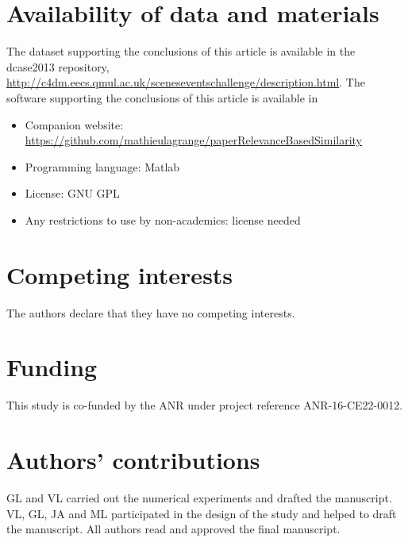 \documentclass[smallextended]{svjour3}
\begin{document}
\section*{Availability of data and materials}
The dataset supporting the conclusions of this article is available in the dcase2013 repository,  \sloppy \url{http://c4dm.eecs.qmul.ac.uk/sceneseventschallenge/description.html}.
The software supporting the conclusions of this article is available in
\begin{itemize}
\item \sloppy Companion website: \url{https://github.com/mathieulagrange/paperRelevanceBasedSimilarity}
\item Programming language: Matlab
\item License: GNU GPL
\item Any restrictions to use by non-academics: license needed
\end{itemize}


\section*{Competing interests}
The authors declare that they have no competing interests.

\section*{Funding}
This study is co-funded by the ANR under project reference ANR-16-CE22-0012.

\section*{Authors' contributions}
GL and VL carried out the numerical experiments and drafted the manuscript. VL, GL, JA and ML participated in the design of the study and helped to draft the manuscript.
All authors read and approved the final manuscript.


%
%
\printbibliography
\end{document}

